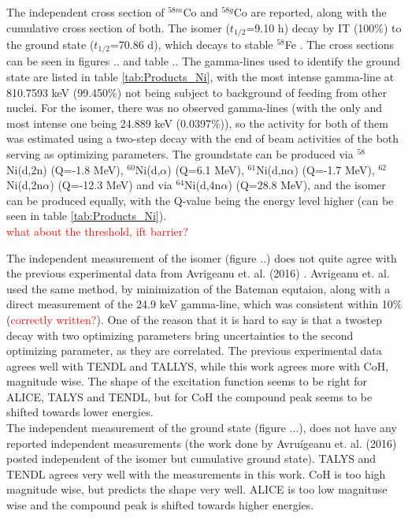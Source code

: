 \subsubsection{}
The independent cross section of $^{58m}$Co and $^{58g}$Co are reported, along with the cumulative cross section of both. The isomer ($t_{1/2}$=9.10 h) decay by IT (100\%) to the ground state ($t_{1/2}$=70.86 d), which decays to stable $^{58}$Fe \cite{Nesaraja2010a}. The cross sections can be seen in figures .. and table .. The gamma-lines used to identify the ground state are listed in table \ref{tab:Products_Ni}, with the most intense gamma-line at 810.7593 keV (99.450\%) not being subject to background of feeding from other nuclei. For the isomer, there was no observed gamma-lines (with the only and most intense one being 24.889 keV (0.0397\%)), so the activity for both of them was estimated using a two-step decay with the end of beam activities of the both serving as optimizing parameters. The groundstate can be produced via $^{58}$Ni(d,2n) (Q=-1.8 MeV), $^{60}$Ni(d,$\alpha$) (Q=6.1 MeV), $^{61}$Ni(d,n$\alpha$) (Q=-1.7 MeV), $^{62}$Ni(d,2n$\alpha$) (Q=-12.3 MeV) and via $^{64}$Ni(d,4n$\alpha$) (Q=28.8 MeV), and the isomer can be produced equally, with the Q-value being the energy level higher (can be seen in table \ref{tab:Products_Ni}). \\

\textcolor{red}{what about the threshold, ift barrier? }

\noindent
The independent measurement of the isomer (figure ..) does not quite agree with the previous experimental data from Avrigeanu et. al. (2016) \cite{Avrigeanu2016}. Avrigeanu et. al. used the same method, by minimization of the Bateman equtaion, along with a direct measurement of the 24.9 keV gamma-line, which was consistent within 10\% (\textcolor{red}{correctly written?}). One of the reason that it is hard to say is that a twostep decay with two optimizing parameters bring uncertainties to the second optimizing parameter, as they are correlated. The previous experimental data agrees well with TENDL and TALLYS, while this work agrees more with CoH, magnitude wise. The shape of the excitation function seems to be right for ALICE, TALYS and TENDL, but for CoH the compound peak seems to be shifted towards lower energies.  \\

\noindent 
The independent measurement of the ground state (figure ...), does not have any reported independent measurements (the work done by Avruígeanu et. al. (2016) posted independent of the isomer but cumulative ground state). TALYS and TENDL agrees very well with the measurements in this work. CoH is too high magnitude wise, but predicts the shape very well. ALICE is too low magnituse wise and the compound peak is shifted towards higher energies. \\

